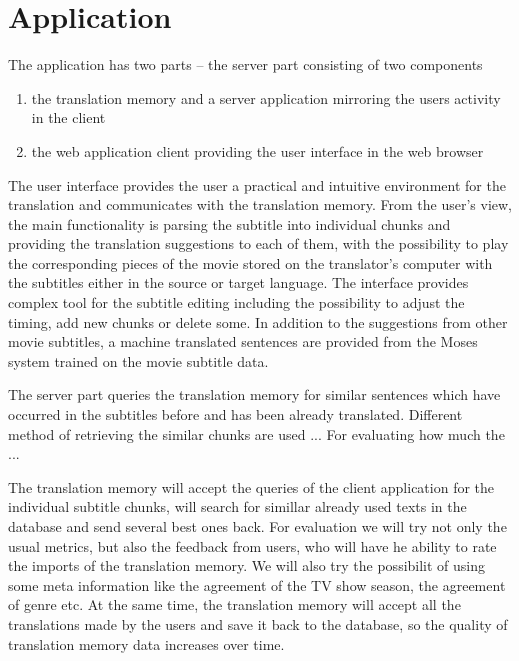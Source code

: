 
\section{Application}

The application has two parts -- the server part consisting of  two components
\begin{enumerate}
\item the translation memory and a server application mirroring the users activity in the client
\item the web application client providing the user interface in the web browser
\end{enumerate}

The user interface provides the user a practical and intuitive environment for the translation and  communicates with the translation memory. %
From the user's view, the main functionality is parsing the subtitle into individual chunks %
and providing the translation suggestions to each of them,  with the possibility to play the corresponding pieces of the movie stored on the translator's computer with the subtitles either in the source or target language. 
The interface provides complex tool for the subtitle editing including the possibility to adjust the timing, add new chunks or delete some. %
In addition to the suggestions from other movie subtitles, a machine translated sentences are provided from the Moses system trained on the movie subtitle data.

The server part queries the translation memory for similar sentences which have occurred in the subtitles before and has been already translated. Different method of retrieving the similar chunks are used ... For evaluating how much the ...

The translation memory will accept the queries of the client application for the individual subtitle chunks, will search for simillar already used texts in the database and send several best ones back. For evaluation we will try not only the usual metrics, but also the feedback from users, who will have he ability to rate the imports of the translation memory. We will also try the possibilit of using some meta information like the agreement %
of the TV show season, the agreement of genre etc. At the same time, the translation memory will accept all the translations made by the users and save it back to the database, so the quality of translation memory data increases over time.


